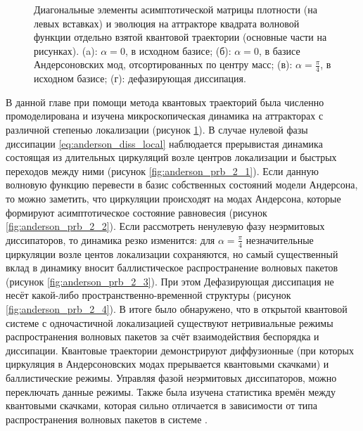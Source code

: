\begin{figure}[h!]
	\legend{}
	\caption[Динамика квантовых траекторий на квантовых аттракторах в зависимости от параметров неэрмитовой диссипации]
	{
		Диагональные элементы асимптотической матрицы плотности (на левых вставках) и эволюция на аттракторе квадрата волновой функции отдельно взятой квантовой траектории (основные части на рисунках). (a): \(\alpha = 0\), в исходном базисе; (б): \(\alpha = 0\), в базисе Андерсоновских мод, отсортированных по центру масс; (в): \(\alpha=\frac{\pi}{4}\), в исходном базисе; (г): дефазирующая диссипация. 
	}
	\label{fig:anderson_prb_2}
\end{figure}
В данной главе при помощи метода квантовых траекторий была численно промоделирована и изучена микроскопическая динамика на аттракторах с различной степенью локализации (рисунок \cref{fig:anderson_prb_2}).
В случае нулевой фазы диссипации \cref{eq:anderson_diss_local} наблюдается прерывистая динамика состоящая из длительных циркуляций возле центров локализации и быстрых переходов между ними (рисунок \cref{fig:anderson_prb_2_1}). 
Если данную волновую функцию перевести в базис собственных состояний модели Андерсона, то можно заметить, что циркуляции происходят на модах Андерсона, которые формируют асимптотическое состояние равновесия (рисунок \cref{fig:anderson_prb_2_2}). 
Если рассмотреть ненулевую фазу неэрмитовых диссипаторов, то динамика резко изменится: для \(\alpha=\frac{\pi}{4}\) незначительные циркуляции возле центов локализации сохраняются, но самый существенный вклад в динамику вносит баллистическое распространение волновых пакетов (рисунок \cref{fig:anderson_prb_2_3}). 
При этом Дефазирующая диссипация не несёт какой-либо пространственно-временной структуры (рисунок \cref{fig:anderson_prb_2_4}).
В итоге было обнаружено, что в открытой квантовой системе с одночастичной локализацией существуют нетривиальные режимы распространения волновых пакетов за счёт взаимодействия беспорядка и диссипации. 
Квантовые траектории демонстрируют диффузионные (при которых циркуляция в Андерсоновских модах прерывается квантовыми скачками) и баллистические режимы. Управляя фазой неэрмитовых диссипаторов, можно переключать данные режимы. 
Также была изучена статистика времён между квантовыми скачками, которая сильно отличается в зависимости от типа распространения волновых пакетов в системе \cite{Yusipov2018}.

